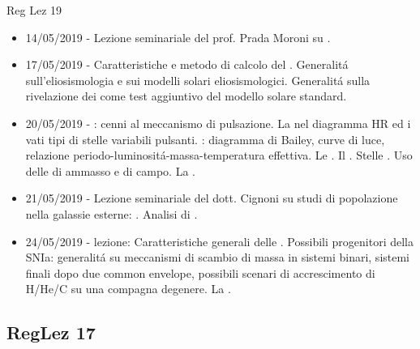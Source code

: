 \begin{frame}[allowframebreaks]{Reg Lez 19}
\begin{itemize}
\item 14/05/2019 - Lezione seminariale del prof. Prada Moroni su .
\item 17/05/2019 - Caratteristiche e metodo di calcolo del . Generalit\'a sull'eliosismologia e sui modelli solari eliosismologici. Generalit\'a sulla rivelazione dei  come test aggiuntivo del modello solare standard.
\item 20/05/2019 - : cenni al meccanismo di pulsazione. La  nel diagramma HR ed i vati tipi di stelle variabili pulsanti. : diagramma di Bailey, curve di luce, relazione periodo-luminosit\'a-massa-temperatura effettiva. Le . Il . Stelle . Uso delle  di ammasso e di campo. La .
\item 21/05/2019 - Lezione seminariale del dott. Cignoni su studi di popolazione nella galassie esterne: . Analisi di .
\item 24/05/2019 - lezione: Caratteristiche generali delle . Possibili progenitori della SNIa: generalit\'a su meccanismi di scambio di massa in sistemi binari, sistemi finali dopo due common envelope, possibili scenari di accrescimento di H/He/C su una compagna degenere. La .
\end{itemize}
\end{frame}

\subsection{RegLez 17}

